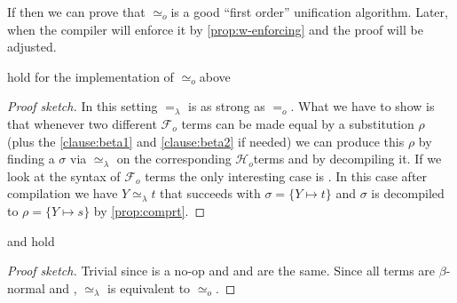 \documentclass[sigconf,natbib=false,review]{acmart}
\newcommand{\appsep}{\ensuremath{\textcolor{lightgray}{\cdot}}}
\newcommand{\EqualRel}{\ensuremath{=}}
\newcommand{\UnifRel}{\ensuremath{\simeq}}
\newcommand{\Uo}{\texorpdfstring{\ensuremath{\UnifRel_o}\xspace}{unif\_o}}
\newcommand{\Eo}{\ensuremath{\EqualRel_o}\xspace}
\newcommand{\Ue}{\ensuremath{\UnifRel_\lambda}\xspace}
\newcommand{\Ee}{\ensuremath{\EqualRel_\lambda}\xspace}
\newcommand{\Fo}{\texorpdfstring{\ensuremath{\mathcal{F}_{\!o}\xspace}}{Fo}} %
\newcommand{\Ho}{\texorpdfstring{\ensuremath{\mathcal{H}_o}\xspace}{Ho}}
\newcommand{\foUnifPb}{\ensuremath{\mathbb{P}}\xspace}
\begin{document}


If \wellb{\foUnifPb} then we can prove that \Uo is a good
``first order'' unification algorithm. Later, when the compiler will
enforce it by \cref{prop:w-enforcing} and the proof will be adjusted.

\begin{lemma}
 hold for the implementation of \Uo above
\end{lemma}
\begin{proof}[Proof sketch]
 In this setting \Ee is as strong as
\Eo. What we have to show is that whenever two different \Fo{}
terms can be made equal by a substitution $\rho$ (plus the \ref{clause:beta1}
and \ref{clause:beta2} if needed) we can produce this $\rho$ by finding
a $\sigma$ via \Ue{} on the corresponding \Ho terms and by decompiling it.
If we look at the syntax of \Fo{} terms the only interesting case is
\elpiIn{fuva X ~\Uo~s}. In this case after compilation we have
$Y \Ue t$ that succeeds with $\sigma = \{ Y \mapsto t\}$ and
$\sigma$ is decompiled to $\rho = \{ Y \mapsto s\}$ by \cref{prop:comprt}.
\end{proof}

\begin{theorem}  and
 hold
\end{theorem}
\begin{proof}[Proof sketch]
Trivial since  is a no-op and \fstep and \hstep are the same.
Since all terms are $\beta$-normal and \wellb, \Ue is equivalent to \Uo.
\end{proof}

\end{document}
